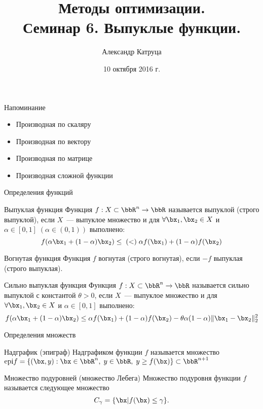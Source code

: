 \documentclass[12pt,russian]{beamer}
\title[Семинар 6]{Методы оптимизации. \\
 Семинар 6. Выпуклые функции.}
\author{Александр Катруца}
\institute{Московский физико-технический институт,\\
Факультет Управления и Прикладной Математики}
\date{10 октября 2016 г.}
\begin{document}
\begin{frame}
\maketitle
\end{frame}

\begin{frame}{Напоминание}
\begin{itemize}
\item Производная по скаляру
\item Производная по вектору
\item Производная по матрице
\item Производная сложной функции
\end{itemize}
\end{frame}

\begin{frame}{Определения функций}
\small
\begin{block}{Выпуклая функция}
Функция $f: X \subset \bbR^n \rightarrow \bbR$ называется выпуклой (строго выпуклой), если $X$~--- выпуклое множество и для $\forall \bx_1, \bx_2 \in X$ и $\alpha \in [0, 1] \; (\alpha \in (0, 1))$  выполнено:
\vspace{-4mm}
\[
f(\alpha \bx_1 + (1 - \alpha)\bx_2) \leq \; (<) \; \alpha f(\bx_1) + (1 - \alpha)f(\bx_2)
\]
\end{block}

\begin{block}{Вогнутая функция}
Функция $f$ вогнутая (строго вогнутая), если $-f$ выпуклая (строго выпуклая).
\end{block}

\begin{block}{Сильно выпуклая функция}
Функция $f: X \subset \bbR^n \rightarrow \bbR$ называется сильно  выпуклой с константой $\theta > 0$, если $X$~--- выпуклое множество и для $\forall \bx_1, \bx_2 \in X$ и $\alpha \in [0, 1]$  выполнено:
\vspace{-4mm}
\[
f(\alpha \bx_1 + (1 - \alpha)\bx_2) \leq \alpha f(\bx_1) + (1 - \alpha)f(\bx_2) - \theta \alpha (1 - \alpha) \| \bx_1 - \bx_2 \|_2^2
\]
\end{block}

\end{frame}

\begin{frame}{Определения множеств}
\begin{block}{Надграфик (эпиграф)}
Надграфиком функции $f$ называется множество $\text{epi}f = \{ (\bx, y) : \bx \in \bbR^n, \; y \in \bbR, \; y \geq f(\bx) \} \subset \bbR^{n+1}$
\end{block}

\begin{block}{Множество подуровней (множество Лебега)}
Множество подуровня функции $f$ называется следующее множество
\[
C_{\gamma} = \{ \bx | f(\bx) \leq \gamma \}.
\]
\end{block}
\end{frame}
\end{document}
